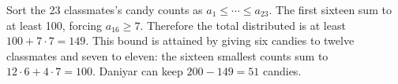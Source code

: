 Sort the 23 classmates's candy counts as $a_1\le\cdots\le a_{23}$. The first sixteen sum to at least 100, forcing $a_{16}\ge7$. Therefore the total distributed is at least $100+7\cdot7=149$. This bound is attained by giving six candies to twelve classmates and seven to eleven: the sixteen smallest counts sum to $12\cdot6+4\cdot7=100$. Daniyar can keep $200-149=\boxed{51}$ candies.
